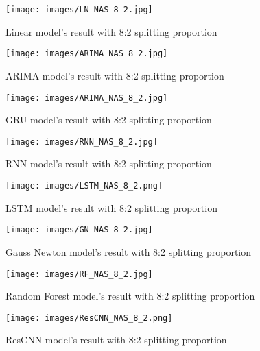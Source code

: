 \documentclass{ieeeojies}
\begin{document}
\begin{figure}[H]
  \centering
  \begin{minipage}{0.8\linewidth}
    \centering
    \texttt{[image: images/LN\_NAS\_8\_2.jpg]}
    \caption{Linear model's result with 8:2 splitting proportion}
    \label{fig22}
  \end{minipage}
\end{figure}
\begin{figure}[H]
  \centering
  \begin{minipage}{0.8\linewidth}
    \centering
    \texttt{[image: images/ARIMA\_NAS\_8\_2.jpg]}
    \caption{ARIMA model's result with 8:2 splitting proportion}
    \label{fig23}
  \end{minipage}
\end{figure}
\begin{figure}[H]
  \centering
  \begin{minipage}{0.8\linewidth}
    \centering
    \texttt{[image: images/ARIMA\_NAS\_8\_2.jpg]}
    \caption{GRU model's result with 8:2 splitting proportion}
    \label{fig24}
  \end{minipage}
\end{figure}
\begin{figure}[H]
  \centering
  \begin{minipage}{0.8\linewidth}
    \centering
    \texttt{[image: images/RNN\_NAS\_8\_2.jpg]}
    \caption{RNN model's result with 8:2 splitting proportion}
    \label{fig25}
  \end{minipage}
\end{figure}
\begin{figure}[H]
  \centering
  \begin{minipage}{0.8\linewidth}
    \centering
    \texttt{[image: images/LSTM\_NAS\_8\_2.png]}
    \caption{LSTM model's result with 8:2 splitting proportion}
    \label{fig26}
  \end{minipage}
\end{figure}
\begin{figure}[H]
  \centering
  \begin{minipage}{0.8\linewidth}
    \centering
        \texttt{[image: images/GN\_NAS\_8\_2.jpg]}
    \caption{Gauss Newton model's result with 8:2 splitting proportion}
    \label{fig27}
  \end{minipage}
\end{figure}
\begin{figure}[H]
  \centering
  \begin{minipage}{0.8\linewidth}
    \centering
        \texttt{[image: images/RF\_NAS\_8\_2.jpg]}
    \caption{Random Forest model's result with 8:2 splitting proportion}
    \label{fig28}
  \end{minipage}
\end{figure}
\begin{figure}[H]
  \centering
  \begin{minipage}{0.8\linewidth}
    \centering
        \texttt{[image: images/ResCNN\_NAS\_8\_2.png]}
    \caption{ResCNN model's result with 8:2 splitting proportion}
    \label{fig28}
  \end{minipage}
\end{figure}
\end{document}
